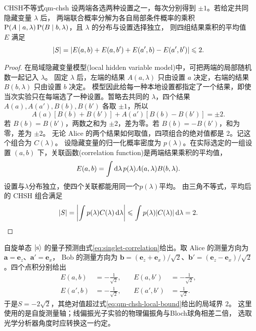 \begin{theorem}{CHSH不等式}{qm-chsh}
    设两端各选两种设置之一，每次分别得到 $\pm1$。若给定共同隐藏变量 $\lambda$ 后，
    两端联合概率分解为各自局部条件概率的乘积 $\P(A \mid a,\lambda)\P(B \mid b,\lambda)$，且 $\lambda$ 的分布与设置选择独立，
    则四组结果乘积的平均值 $E$ 满足
    \begin{equation}\label{eq:qm-chsh-local-bound}
        \abs{S} = \abs{E(a,b) + E(a,b') + E(a',b) - E(a',b')} \leq 2 .
    \end{equation}
\end{theorem}
\begin{proof}
    在局域隐藏变量模型(local hidden variable model)中，可把两端的局部随机数一起记入 $\lambda$。
    固定 $\lambda$ 后，左端的结果 $A(a,\lambda)$ 只由设置 $a$ 决定，右端的结果 $B(b,\lambda)$ 只由设置 $b$ 决定。
    模型因此给每一种本地设置都指定了一个结果，即使当次实验只在每端选了一种设置。暂略去共同的 $\lambda$，四个结果 $A(a),A(a'),B(b),B(b')$ 各取 $\pm1$，所以
    \begin{equation}
        A(a)[B(b) + B(b')] + A(a')[B(b) - B(b')] = \pm2.
    \end{equation}
    若 $B(b) = B(b')$，两数之和为 $\pm2$，差为零。若 $B(b) = -B(b')$，和为零，差为 $\pm2$。
    无论 Alice 的两个结果如何取值，四项组合的绝对值都是 2。记这个组合为 $C(\lambda)$。
    设隐藏变量的归一化概率密度为 $p(\lambda)$。在实际选定的一组设置 $(a,b)$ 下，关联函数(correlation function)是两端结果乘积的平均值，
    \begin{equation}
        E(a,b) = \int\d\lambda\,p(\lambda)A(a,\lambda)B(b,\lambda).
    \end{equation}
    设置与$\lambda$分布独立，使四个关联都能用同一个$p(\lambda)$平均。
    由三角不等式，平均后的 CHSH 组合满足
    \[
        \abs{S} = \biggabs{\int p(\lambda)C(\lambda)\d\lambda}
        \leq \int p(\lambda)\abs{C(\lambda)}\d\lambda = 2 .
    \]
\end{proof}
自旋单态 $\ket{\singlet}$ 的量子预测由式\eqref{eq:singlet-correlation}给出。取 Alice 的测量方向为 $\bm a = \bm e_z$、$\bm a' = \bm e_x$，
Bob 的测量方向为 $\bm b = (\bm e_z + \bm e_x)/\sqrt2$、$\bm b' = (\bm e_z - \bm e_x)/\sqrt2$。四个点积分别给出
\begin{subequations}
    \begin{alignat}{2}
        E(a,b) &= -\frac1{\sqrt2},
        &\quad E(a,b') &= -\frac1{\sqrt2},\\
        E(a',b) &= -\frac1{\sqrt2},
        &\quad E(a',b') &= \frac1{\sqrt2}.
    \end{alignat}
\end{subequations}
于是$S = -2\sqrt2$，其绝对值超过式\eqref{eq:qm-chsh-local-bound}给出的局域界 $2$。
这里使用的是自旋测量轴；线偏振光子实验的物理偏振角与Bloch球角相差二倍，
选取光学分析器角度时应转换这一约定。


